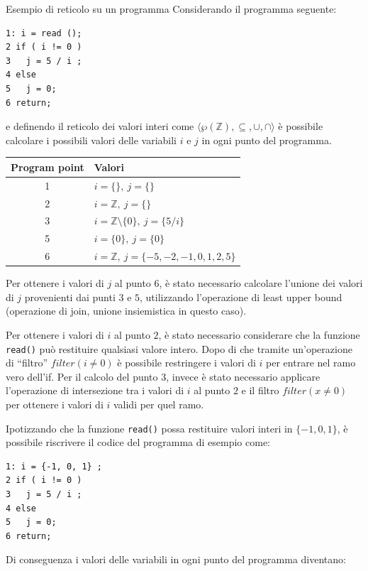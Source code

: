 \begin{esempio}{Esempio di reticolo su un programma}{}
Considerando il programma seguente:

\begin{verbatim}
1: i = read ();
2 if ( i != 0 )
3   j = 5 / i ;
4 else
5   j = 0;
6 return;
\end{verbatim}

e definendo il reticolo dei valori interi come $\langle
\wp(\mathbb{Z}), \subseteq, \cup, \cap \rangle$ è possibile
calcolare i possibili valori delle variabili $i$ e $j$ in ogni punto
del programma.

\medskip

\begin{center}
\begin{tabular}{|c|l|}
  \hline
  \textbf{Program point} & \textbf{Valori} \\
  \hline
  \hline
  1 & $i = \{\}, \ j = \{\}$ \\
  \hline
  2 & $i = \mathbb{Z}, \ j = \{\}$ \\
  \hline
  3 & $i = \mathbb{Z} \setminus \{0\}, \ j = \{5 / i \}$ \\
  \hline
  5 & $i = \{0\}, \ j = \{0\}$ \\
  \hline
  6 & $i = \mathbb{Z}, \ j = \{-5, -2, -1, 0, 1, 2, 5 \}$ \\
  \hline
\end{tabular}
\end{center}

Per ottenere i valori di $j$ al punto $6$, è stato necessario calcolare
l'unione dei valori di $j$ provenienti dai punti $3$ e $5$, utilizzando
l'operazione di least upper bound (operazione di join, unione insiemistica
in questo caso).

Per ottenere i valori di $i$ al punto $2$, è stato necessario considerare
che la funzione \texttt{read()} può restituire qualsiasi valore intero.
Dopo di che tramite un'operazione di ``filtro'' $filter(i \neq 0)$ è
  possibile restringere i valori di $i$ per entrare nel ramo vero dell'if.
Per il calcolo del punto $3$, invece è stato necessario applicare l'operazione
di intersezione tra i valori di $i$ al punto $2$ e il filtro $filter(x \neq 0)$
per ottenere i valori di $i$ validi per quel ramo.


Ipotizzando che la funzione \texttt{read()} possa restituire valori interi in
$\{ -1, 0, 1 \}$, è possibile riscrivere il codice del programma di esempio
come:
\begin{verbatim}
1: i = {-1, 0, 1} ;
2 if ( i != 0 )
3   j = 5 / i ;
4 else
5   j = 0;
6 return;
\end{verbatim}
Di conseguenza i valori delle variabili in ogni punto del programma
diventano:


\end{esempio}
